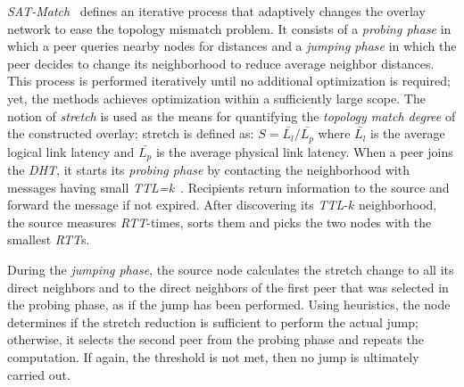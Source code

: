 \emph{SAT-Match}~\cite{RGJZ2004} defines an iterative process that 
adaptively changes the overlay network to ease the topology mismatch problem. 
It consists of a \emph{probing phase} in which a peer queries nearby nodes 
for distances and a \emph{jumping phase} in which the peer decides 
to change its neighborhood to reduce average neighbor distances. 
This process is performed iteratively
until no additional optimization is required; 
yet, the methods achieves optimization within a
sufficiently large scope.
The notion of \emph{stretch} is used as the means for quantifying 
the \emph{topology match degree} of the constructed overlay;
stretch is defined as: 
$S = \bar{L_l}/\bar{L_p}$ where $\bar{L_l}$ is the average logical link
latency and $\bar{L_p}$ is the average physical link latency.
% 
When a peer joins the \emph{DHT}, it starts 
its \emph{probing phase} by contacting the neighborhood with 
messages having small \emph{TTL=k}~\cite{jiang_lightflood_2008}. 
Recipients return information to the source and forward the message 
if not expired. 
After discovering its \emph{TTL}-$k$ neighborhood, 
the source measures \emph{RTT}-times, sorts them
and picks the two nodes with the smallest \emph{RTT}s.

During the \emph{jumping phase}, the source node calculates the 
stretch change to all its direct neighbors and to the direct neighbors
of the first peer that was selected in the probing phase, as if
the jump has been performed. 
Using heuristics, the node determines if the stretch
reduction is sufficient to perform the actual jump; 
otherwise, it selects the second peer from the probing phase 
and repeats the computation. If again, the
threshold is not met, then no jump is ultimately carried out.

